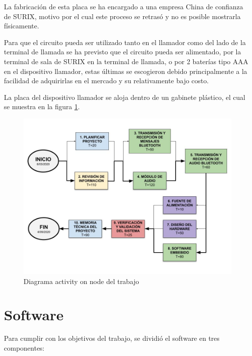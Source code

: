 La fabricación de esta placa se ha encargado a una empresa China de confianza de SURIX, motivo por el cual este proceso se retrasó y no es posible mostrarla físicamente.

Para que el circuito pueda ser utilizado tanto en el llamador como del lado de la terminal de llamada se ha previsto que el circuito pueda ser alimentado, por la terminal de sala de SURIX en la terminal de llamada, o por 2 baterías tipo AAA en el dispositivo llamador, estas últimas se escogieron debido principalmente a la facilidad de adquirirlas en el mercado y su relativamente bajo costo.

La placa del dispositivo llamador se aloja dentro de un gabinete plástico, el cual se muestra en la figura \ref{fig:gabinete}.

\begin{figure}[htpb]
	\centering
	\includegraphics[scale=0.4]{./Figures/ActivityOnNode.jpg}
	\caption{Diagrama activity on node del trabajo}
	\label{fig:gabinete}
\end{figure}


\section{Software}

Para cumplir con los objetivos del trabajo, se dividió el software en tres componentes:

